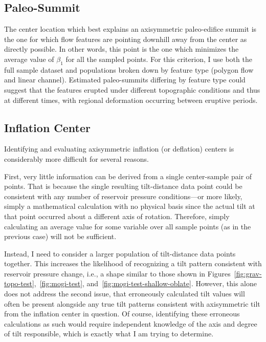 \subsection{Paleo-Summit}\label{sec:paleo-summit}

The center location which best explains an axisymmetric paleo-edifice summit is the one for which flow features are pointing downhill away from the center as directly possible. In other words, this point is the one which minimizes the average value of $\beta_1$ for all the sampled points. For this criterion, I use both the full sample dataset and populations broken down by feature type (polygon flow and linear channel). Estimated paleo-summits differing by feature type could suggest that the features erupted under different topographic conditions and thus at different times, with regional deformation occurring between eruptive periods.

\subsection{Inflation Center}\label{sec:inflation-center}

Identifying and evaluating axisymmetric inflation (or deflation) centers is considerably more difficult for several reasons.

First, very little information can be derived from a single center-sample pair of points. That is because the single resulting tilt-distance data point could be consistent with any number of reservoir pressure conditions---or more likely, simply a mathematical calculation with no physical basis since the actual tilt at that point occurred about a different axis of rotation. Therefore, simply calculating an average value for some variable over all sample points (as in the previous case) will not be sufficient.

Instead, I need to consider a larger population of tilt-distance data points together. This increases the likelihood of recognizing a tilt pattern consistent with reservoir pressure change, i.e., a shape similar to those shown in Figures~\ref{fig:grav-topo-test},~\ref{fig:mogi-test}, and~\ref{fig:mogi-test-shallow-oblate}. However, this alone does not address the second issue, that erroneously calculated tilt values will often be present alongside any true tilt patterns consistent with axisymmetric tilt from the inflation center in question. Of course, identifying these erroneous calculations as such would require independent knowledge of the axis and degree of tilt responsible, which is exactly what I am trying to determine.

